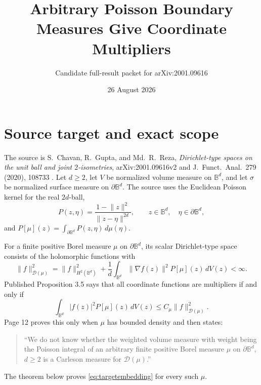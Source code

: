 \documentclass[11pt]{article}
\title{Arbitrary Poisson Boundary Measures Give Coordinate Multipliers}
\author{Candidate full-result packet for arXiv:2001.09616}
\date{26 August 2026}
\theoremstyle{remark}
\newcommand{\Bd}{\mathbb B^d}
\newcommand{\Sd}{\partial\mathbb B^d}
\begin{document}
\maketitle

\begin{center}
\end{center}

\section{Source target and exact scope}

The source is S.~Chavan, R.~Gupta, and Md.~R.~Reza,
\emph{Dirichlet-type spaces on the unit ball and joint $2$-isometries},
arXiv:2001.09616v2 and J.~Funct.~Anal.~279 (2020), 108733
\cite{CGR2020}.  Let $d\geq2$, let $V$ be normalized volume measure on
$\Bd$, and let $\sigma$ be normalized surface measure on $\Sd$.  The source
uses the Euclidean Poisson kernel for the real $2d$-ball,
\begin{equation}\label{eq:poisson}
 P(z,\eta)=\frac{1-\lVert z\rVert^2}{\lVert z-\eta\rVert^{2d}},
 \qquad z\in\Bd,\quad \eta\in\Sd,
\end{equation}
and $P[\mu](z)=\int_{\Sd}P(z,\eta)\,d\mu(\eta)$.

For a finite positive Borel measure $\mu$ on $\Sd$, its scalar
Dirichlet-type space consists of the holomorphic functions with
\begin{equation}\label{eq:Dnorm}
 \lVert f\rVert_{\mathscr D(\mu)}^2
 =\lVert f\rVert_{H^2(\Bd)}^2
 +\frac1d\int_{\Bd}\lVert\nabla f(z)\rVert^2P[\mu](z)\,dV(z)<\infty.
\end{equation}
Published Proposition 3.5 says that all coordinate functions are multipliers
if and only if
\begin{equation}\label{eq:targetembedding}
 \int_{\Bd}|f(z)|^2P[\mu](z)\,dV(z)
 \leq C_\mu\lVert f\rVert_{\mathscr D(\mu)}^2.
\end{equation}
Page 12 proves this only when $\mu$ has bounded density and then states:
\begin{quote}
``We do not know whether the weighted volume measure with weight being the
Poisson integral of an arbitrary finite positive Borel measure $\mu$ on
$\partial\mathbb B^d$, $d\geq2$ is a Carleson measure for
$\mathscr D(\mu)$.''
\end{quote}
The theorem below proves \eqref{eq:targetembedding} for every such $\mu$.
\end{document}
